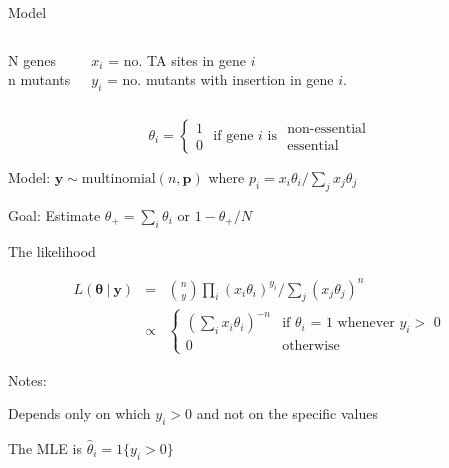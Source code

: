 \documentclass[aspectratio=169,12pt,t]{beamer}
\begin{document}
\begin{frame}{Model}

\begin{columns}


N genes \\[12pt]

n mutants


$x_i$ = no. TA sites in gene $i$ \\[12pt]

$y_i$ = no. mutants with insertion in gene $i$.
\end{columns}


\bigskip\bigskip\bigskip

  $$  \theta_i = \left\{ \begin{array}{c} 1 \\ 0 \end{array} \text{ if gene $i$ is  }
      \begin{array}{c} \text{non-essential}  \\ \text{essential} \end{array} \right. $$


      \bigskip\bigskip\bigskip

      {\color{title} Model}: $\boldsymbol{y} \sim
      \text{multinomial}(n,\boldsymbol{p})$ \qquad where $p_i = x_i  \theta_i / \sum_j x_j \theta_j$

\bigskip\bigskip

      {\color{title} Goal}: Estimate $\theta_+ = \sum_i \theta_i$
      \qquad or \qquad $1 - \theta_+/N$

  \note{
  }
\end{frame}



\begin{frame}{The likelihood}


  \begin{eqnarray*}
    L(\boldsymbol{\theta} \ | \ \boldsymbol{y}) & = & {n \choose y} \prod_i (x_i \theta_i)^{y_i} / \sum_j (x_j \theta_j)^n \\[14pt]
                     & \propto & \left\{ \begin{array}{cl} (\sum_i x_i  \theta_i)^{-n} & \text{if $\theta_i$ = 1 whenever $y_i >$ 0} \\[12pt] 0  & \text{otherwise} \end{array}\right.
  \end{eqnarray*}



  \bigskip \bigskip

  {\color{title} Notes:}
  \bi
  \item Depends only on which $y_i>0$ and not on the specific values
  \item The MLE is $\hat{\theta}_i = 1\{y_i > 0\}$
    \ei


\note{
}
\end{frame}
\end{document}
